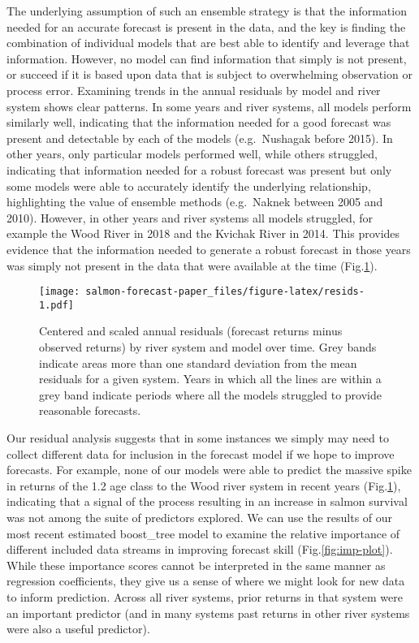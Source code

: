 \documentclass[
]{article}
\begin{document}
The underlying assumption of such an ensemble strategy is that the information needed for an accurate forecast is present in the data, and the key is finding the combination of individual models that are best able to identify and leverage that information. However, no model can find information that simply is not present, or succeed if it is based upon data that is subject to overwhelming observation or process error. Examining trends in the annual residuals by model and river system shows clear patterns. In some years and river systems, all models perform similarly well, indicating that the information needed for a good forecast was present and detectable by each of the models (e.g.~Nushagak before 2015). In other years, only particular models performed well, while others struggled, indicating that information needed for a robust forecast was present but only some models were able to accurately identify the underlying relationship, highlighting the value of ensemble methods (e.g.~Naknek between 2005 and 2010). However, in other years and river systems all models struggled, for example the Wood River in 2018 and the Kvichak River in 2014. This provides evidence that the information needed to generate a robust forecast in those years was simply not present in the data that were available at the time (Fig.\ref{fig:resids}).

\begin{figure}
\centering
\texttt{[image: salmon-forecast-paper\_files/figure-latex/resids-1.pdf]}
\caption{\label{fig:resids}Centered and scaled annual residuals (forecast returns minus observed returns) by river system and model over time. Grey bands indicate areas more than one standard deviation from the mean residuals for a given system. Years in which all the lines are within a grey band indicate periods where all the models struggled to provide reasonable forecasts.}
\end{figure}

Our residual analysis suggests that in some instances we simply may need to collect different data for inclusion in the forecast model if we hope to improve forecasts. For example, none of our models were able to predict the massive spike in returns of the 1.2 age class to the Wood river system in recent years (Fig.\ref{fig:resids}), indicating that a signal of the process resulting in an increase in salmon survival was not among the suite of predictors explored. We can use the results of our most recent estimated boost\_tree model to examine the relative importance of different included data streams in improving forecast skill (Fig.\ref{fig:imp-plot}). While these importance scores cannot be interpreted in the same manner as regression coefficients, they give us a sense of where we might look for new data to inform prediction. Across all river systems, prior returns in that system were an important predictor (and in many systems past returns in other river systems were also a useful predictor).
\end{document}
